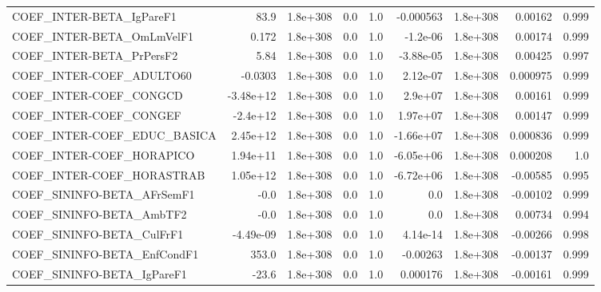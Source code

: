 \begin{tabular}{lrrrrrrrr}
COEF\_INTER-BETA\_IgPareF1              &        83.9 &     1.8e+308 &        0.0 &      1.0 &  -0.000563 &    1.8e+308 &      0.00162 &         0.999 \\
COEF\_INTER-BETA\_OmLmVelF1             &       0.172 &     1.8e+308 &        0.0 &      1.0 &   -1.2e-06 &    1.8e+308 &      0.00174 &         0.999 \\
COEF\_INTER-BETA\_PrPersF2              &        5.84 &     1.8e+308 &        0.0 &      1.0 &  -3.88e-05 &    1.8e+308 &      0.00425 &         0.997 \\
COEF\_INTER-COEF\_ADULTO60              &     -0.0303 &     1.8e+308 &        0.0 &      1.0 &   2.12e-07 &    1.8e+308 &     0.000975 &         0.999 \\
COEF\_INTER-COEF\_CONGCD                &   -3.48e+12 &     1.8e+308 &        0.0 &      1.0 &    2.9e+07 &    1.8e+308 &      0.00161 &         0.999 \\
COEF\_INTER-COEF\_CONGEF                &    -2.4e+12 &     1.8e+308 &        0.0 &      1.0 &   1.97e+07 &    1.8e+308 &      0.00147 &         0.999 \\
COEF\_INTER-COEF\_EDUC\_BASICA           &    2.45e+12 &     1.8e+308 &        0.0 &      1.0 &  -1.66e+07 &    1.8e+308 &     0.000836 &         0.999 \\
COEF\_INTER-COEF\_HORAPICO              &    1.94e+11 &     1.8e+308 &        0.0 &      1.0 &  -6.05e+06 &    1.8e+308 &     0.000208 &           1.0 \\
COEF\_INTER-COEF\_HORASTRAB             &    1.05e+12 &     1.8e+308 &        0.0 &      1.0 &  -6.72e+06 &    1.8e+308 &     -0.00585 &         0.995 \\
COEF\_SININFO-BETA\_AFrSemF1            &        -0.0 &     1.8e+308 &        0.0 &      1.0 &        0.0 &    1.8e+308 &     -0.00102 &         0.999 \\
COEF\_SININFO-BETA\_AmbTF2              &        -0.0 &     1.8e+308 &        0.0 &      1.0 &        0.0 &    1.8e+308 &      0.00734 &         0.994 \\
COEF\_SININFO-BETA\_CulFrF1             &   -4.49e-09 &     1.8e+308 &        0.0 &      1.0 &   4.14e-14 &    1.8e+308 &     -0.00266 &         0.998 \\
COEF\_SININFO-BETA\_EnfCondF1           &       353.0 &     1.8e+308 &        0.0 &      1.0 &   -0.00263 &    1.8e+308 &     -0.00137 &         0.999 \\
COEF\_SININFO-BETA\_IgPareF1            &       -23.6 &     1.8e+308 &        0.0 &      1.0 &   0.000176 &    1.8e+308 &     -0.00161 &         0.999 \\

\end{tabular}
